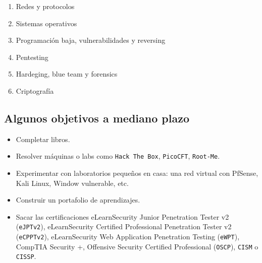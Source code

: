 
\begin{enumerate}[label=\textnormal{(\arabic*)}]
\item Redes y protocolos 
\item Sistemas operativos 
\item Programación baja, vulnerabilidades y reversing 
\item Pentesting 
\item Hardeging, blue team y forensics 
\item Criptografía
\end{enumerate}

\subsection{Algunos objetivos a mediano plazo}

\begin{itemize}
\item Completar libros. 
\item Resolver máquinas o labs como \texttt{Hack The Box}, \texttt{PicoCFT}, \texttt{Root-Me}. 
\item Experimentar con laboratorios pequeños en casa: una red virtual con PfSense, Kali Linux, Window vulnerable, etc.
\item Construir un portafolio de aprendizajes. 
\item Sacar las certificaciones eLearnSecurity Junior Penetration Tester v2 (\texttt{eJPTv2}), eLearnSecurity Certified Professional Penetration Tester v2 (\texttt{eCPPTv2}), eLearnSecurity Web Application Penetration Testing (\texttt{eWPT}), CompTIA Security +, Offensive Security Certified Professional (\texttt{OSCP}), \texttt{CISM} o \texttt{CISSP}.
\end{itemize}

